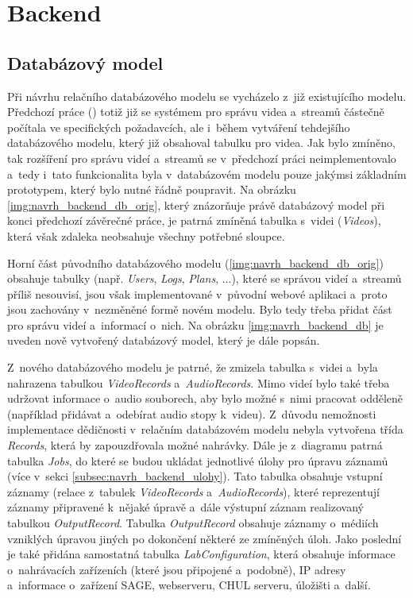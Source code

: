 \documentclass[thesis=M,czech]{FITthesis}[2012/06/26]
\begin{document}
\section{Backend} \label{sec:navrh_backend}
\subsection{Databázový model} \label{subsec:navrh_backend_databaze}
Při návrhu relačního databázového modelu se vycházelo z~již existujícího modelu. Předchozí práce (\cite{solankar}) totiž již se systémem pro správu videa a~streamů částečně počítala ve specifických požadavcích, ale i~během vytváření tehdejšího databázového modelu, který již obsahoval tabulku pro videa. Jak bylo zmíněno, tak rozšíření pro správu videí a~streamů se v~předchozí práci neimplementovalo a~tedy i~tato funkcionalita byla v~databázovém modelu pouze jakýmsi základním prototypem, který bylo nutné řádně poupravit. Na obrázku \ref{img:navrh_backend_db_orig}, který znázorňuje právě databázový model při konci předchozí závěrečné práce, je patrná zmíněná tabulka s~videi (\textit{Videos}), která však zdaleka neobsahuje všechny potřebné sloupce.

Horní část původního databázového modelu (\ref{img:navrh_backend_db_orig}) obsahuje tabulky (např. \textit{Users}, \textit{Logs}, \textit{Plans}, ...), které se správou videí a~streamů příliš nesouvisí, jsou však implementované v~původní webové aplikaci a~proto jsou zachovány v~nezměněné formě novém modelu. Bylo tedy třeba přidat část pro správu videí a~informací o~nich. Na obrázku \ref{img:navrh_backend_db} je uveden nově vytvořený databázový model, který je dále popsán.

Z~nového databázového modelu je patrné, že zmizela tabulka s~videi a~byla nahrazena tabulkou \textit{VideoRecords} a~\textit{AudioRecords}. Mimo videí bylo také třeba udržovat informace o~audio souborech, aby bylo možné s~nimi pracovat odděleně (například přidávat a~odebírat audio stopy k~videu). Z~důvodu nemožnosti implementace dědičnosti v~relačním databázovém modelu nebyla vytvořena třída \textit{Records}, která by zapouzdřovala možné nahrávky. Dále je z~diagramu patrná tabulka \textit{Jobs},  do které se budou ukládat jednotlivé úlohy pro úpravu záznamů (více v~sekci \ref{subsec:navrh_backend_ulohy}). Tato tabulka obsahuje vstupní záznamy (relace z~tabulek \textit{VideoRecords} a~\textit{AudioRecords}), které reprezentují záznamy připravené k~nějaké úpravě a~dále výstupní záznam realizovaný tabulkou \textit{OutputRecord}. Tabulka \textit{OutputRecord} obsahuje záznamy o~médiích vzniklých úpravou jiných po dokončení některé ze zmíněných úloh. Jako poslední je také přidána samostatná tabulka \textit{LabConfiguration}, která obsahuje informace o~nahrávacích zařízeních (které jsou připojené a~podobně), IP adresy a~informace o~zařízení SAGE, webserveru, CHUL serveru, úložišti a~další.
\end{document}
